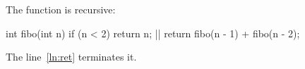 \documentclass{article}
\begin{document}
The function  is recursive:
\begin{ffcode}
int fibo(int n) {
  if (n < 2) {
    return n; |$\label{ln:ret}$|
  }
  return fibo(n - 1) + fibo(n - 2);
}
\end{ffcode}
The line~\ref{ln:ret} terminates it.
\end{document}
